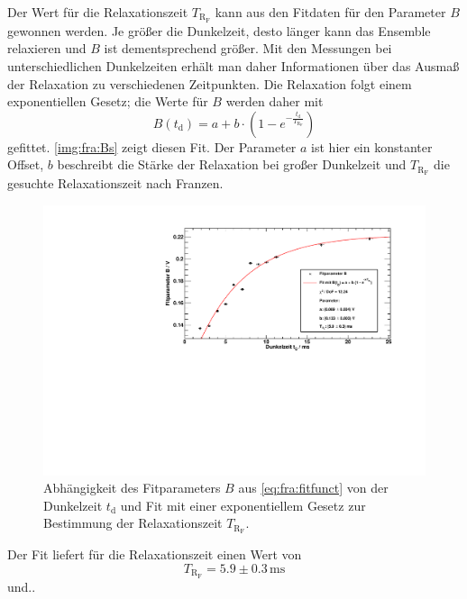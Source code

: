 Der Wert für die Relaxationszeit $T_{\text{R}_\text{F}}$ kann aus den Fitdaten für den Parameter $B$ gewonnen werden.
Je größer die Dunkelzeit, desto länger kann das Ensemble relaxieren und $B$ ist dementsprechend größer.
Mit den Messungen bei unterschiedlichen Dunkelzeiten erhält
man daher Informationen über das Ausmaß der Relaxation zu
verschiedenen Zeitpunkten.
Die Relaxation folgt einem exponentiellen Gesetz; die Werte für $B$ werden daher mit
\begin{equation}
  B(t_\text{d})= a + b \cdot \left(1 - e^{-\frac{t_\text{d}}{T_{\text{R}_\text{F}}}}\right)
\end{equation}
gefittet.
\autoref{img:fra:Bs} zeigt diesen Fit. Der Parameter $a$ ist hier ein konstanter Offset,
$b$ beschreibt die Stärke der Relaxation bei großer Dunkelzeit und
$T_{\text{R}_\text{F}}$ die gesuchte Relaxationszeit nach Franzen.

\begin{figure}[H]
\begin{center}
  \includegraphics[width=\textwidth]{../img/part6/BFit.pdf}
  \caption{Abhängigkeit des Fitparameters $B$ aus \autoref{eq:fra:fitfunct} von der Dunkelzeit $t_\text{d}$ und Fit
  mit einer exponentiellem Gesetz zur Bestimmung der Relaxationszeit $T_{\text{R}_\text{F}}$.}
  \label{img:fra:Bs}
\end{center}
\end{figure}

Der Fit liefert für die Relaxationszeit einen Wert von
\begin{equation}
  T_{\text{R}_\text{F}} = 5.9 \pm 0.3 \,\text{ms}
\end{equation}
und..

